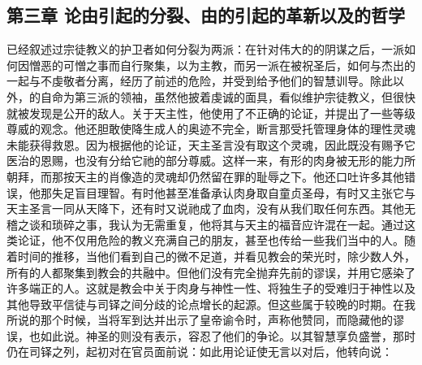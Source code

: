 
\subsection{第三章 论由引起的分裂、由的引起的革新以及的哲学}

已经叙述过宗徒教义的护卫者如何分裂为两派：在针对伟大的的阴谋之后，一派如何因憎恶的可憎之事而自行聚集，以为主教，而另一派在被祝圣后，如何与杰出的一起与不虔敬者分离，经历了前述的危险，并受到给予他们的智慧训导。除此以外，的自命为第三派的领袖，虽然他披着虔诚的面具，看似维护宗徒教义，但很快就被发现是公开的敌人。关于天主性，他使用了不正确的论证，并提出了一些等级尊威的观念。他还胆敢使降生成人的奥迹不完全，断言那受托管理身体的理性灵魂未能获得救恩。因为根据他的论证，天主圣言没有取这个灵魂，因此既没有赐予它医治的恩赐，也没有分给它祂的部分尊威。这样一来，有形的肉身被无形的能力所朝拜，而那按天主的肖像造的灵魂却仍然留在罪的耻辱之下。他还口吐许多其他错误，他那失足盲目理智。有时他甚至准备承认肉身取自童贞圣母，有时又主张它与天主圣言一同从天降下，还有时又说祂成了血肉，没有从我们取任何东西。其他无稽之谈和琐碎之事，我认为无需重复，他将其与天主的福音应许混在一起。通过这类论证，他不仅用危险的教义充满自己的朋友，甚至也传给一些我们当中的人。随着时间的推移，当他们看到自己的微不足道，并看见教会的荣光时，除少数人外，所有的人都聚集到教会的共融中。但他们没有完全抛弃先前的谬误，并用它感染了许多端正的人。这就是教会中关于肉身与神性一性、将独生子的受难归于神性以及其他导致平信徒与司铎之间分歧的论点增长的起源。但这些属于较晚的时期。在我所说的那个时候，当将军到达并出示了皇帝谕令时，声称他赞同，而隐藏他的谬误，也如此说。神圣的则没有表示，容忍了他们的争论。以其智慧享负盛誉，那时仍在司铎之列，起初对在官员面前说：如此用论证使无言以对后，他转向说：\par

